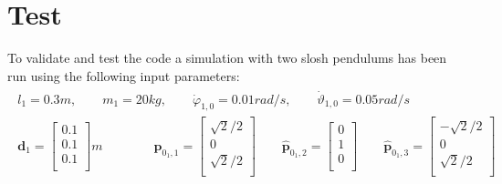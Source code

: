 \documentclass[]{BasiliskReportMemo}
\begin{document}
\section{Test}
To validate and test the code a simulation with two slosh pendulums has been run using the following input parameters:
\begin{align}
\begin{split}
l_1=0.3 m, \qquad m_1=20 kg, \qquad \dot{\varphi}_{1,0}=0.01 rad/s, \qquad \dot{\vartheta}_{1,0}= 0.05 rad/s \\
\bm{d}_1=
\begin{bmatrix}
0.1 \\
0.1 \\
0.1\\
\end{bmatrix} m
\qquad
\qquad
\bm{\hat{p}}_{0_1,1}=
\begin{bmatrix}
\sqrt{2}/2 \\
0 \\
\sqrt{2}/2\\
\end{bmatrix}
\qquad
\bm{\hat{p}}_{0_1,2}=
\begin{bmatrix}
0 \\
1 \\
0\\
\end{bmatrix}
\qquad
\bm{\hat{p}}_{0_1,3}=
\begin{bmatrix}
-\sqrt{2}/2 \\
0 \\
\sqrt{2}/2\\
\end{bmatrix}
\end{split}
\end{align}
\end{document}
